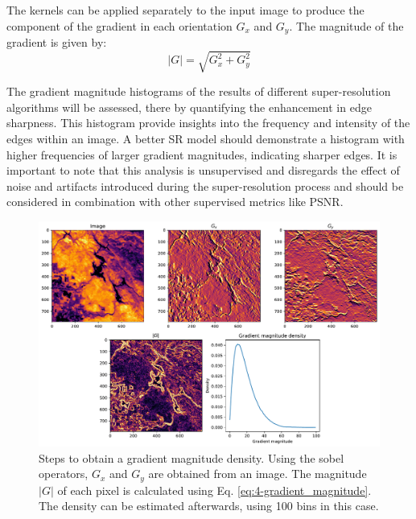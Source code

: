          The kernels can be applied separately to the input image to produce the component of the gradient in each orientation $G_x$ and $G_y$. The magnitude of the gradient  is given by: 
         \begin{equation}
             |G| = \sqrt{G_x^2 + G_y^2}
             \label{eq:4-gradient_magnitude}
         \end{equation}

         The gradient magnitude histograms of the results of different super-resolution algorithms will be assessed, there by quantifying the enhancement in edge sharpness.  This histogram provide insights into the frequency and intensity of the edges within an image. A better SR model should demonstrate a histogram with higher frequencies of larger gradient magnitudes, indicating sharper edges. It is important to note that this analysis is unsupervised and disregards the effect of noise and artifacts introduced during the super-resolution process and should be considered in combination with other supervised metrics like PSNR.

         \begin{figure}
             \centering
             \includegraphics[width=\textwidth]{Includes/4-gradient-analysis.pdf}
             \caption{Steps to obtain a gradient magnitude density. Using the sobel operators, $G_x$ and $G_y$ are obtained from an image. The magnitude $|G|$ of each pixel is calculated using Eq. \ref{eq:4-gradient_magnitude}. The density can be estimated afterwards, using 100 bins in this case.}
             \label{fig:4-gradient-analysis}
         \end{figure}

         

\clearpage

        

        
        
